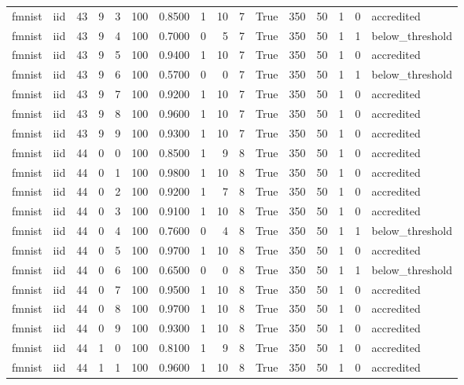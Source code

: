 \begin{tabular}{llrrrrrrrrrrrrrl}
fmnist & iid & 43 & 9 & 3 & 100 & 0.8500 & 1 & 10 & 7 & True & 350 & 50 & 1 & 0 & accredited \\
fmnist & iid & 43 & 9 & 4 & 100 & 0.7000 & 0 & 5 & 7 & True & 350 & 50 & 1 & 1 & below\_threshold \\
fmnist & iid & 43 & 9 & 5 & 100 & 0.9400 & 1 & 10 & 7 & True & 350 & 50 & 1 & 0 & accredited \\
fmnist & iid & 43 & 9 & 6 & 100 & 0.5700 & 0 & 0 & 7 & True & 350 & 50 & 1 & 1 & below\_threshold \\
fmnist & iid & 43 & 9 & 7 & 100 & 0.9200 & 1 & 10 & 7 & True & 350 & 50 & 1 & 0 & accredited \\
fmnist & iid & 43 & 9 & 8 & 100 & 0.9600 & 1 & 10 & 7 & True & 350 & 50 & 1 & 0 & accredited \\
fmnist & iid & 43 & 9 & 9 & 100 & 0.9300 & 1 & 10 & 7 & True & 350 & 50 & 1 & 0 & accredited \\
fmnist & iid & 44 & 0 & 0 & 100 & 0.8500 & 1 & 9 & 8 & True & 350 & 50 & 1 & 0 & accredited \\
fmnist & iid & 44 & 0 & 1 & 100 & 0.9800 & 1 & 10 & 8 & True & 350 & 50 & 1 & 0 & accredited \\
fmnist & iid & 44 & 0 & 2 & 100 & 0.9200 & 1 & 7 & 8 & True & 350 & 50 & 1 & 0 & accredited \\
fmnist & iid & 44 & 0 & 3 & 100 & 0.9100 & 1 & 10 & 8 & True & 350 & 50 & 1 & 0 & accredited \\
fmnist & iid & 44 & 0 & 4 & 100 & 0.7600 & 0 & 4 & 8 & True & 350 & 50 & 1 & 1 & below\_threshold \\
fmnist & iid & 44 & 0 & 5 & 100 & 0.9700 & 1 & 10 & 8 & True & 350 & 50 & 1 & 0 & accredited \\
fmnist & iid & 44 & 0 & 6 & 100 & 0.6500 & 0 & 0 & 8 & True & 350 & 50 & 1 & 1 & below\_threshold \\
fmnist & iid & 44 & 0 & 7 & 100 & 0.9500 & 1 & 10 & 8 & True & 350 & 50 & 1 & 0 & accredited \\
fmnist & iid & 44 & 0 & 8 & 100 & 0.9700 & 1 & 10 & 8 & True & 350 & 50 & 1 & 0 & accredited \\
fmnist & iid & 44 & 0 & 9 & 100 & 0.9300 & 1 & 10 & 8 & True & 350 & 50 & 1 & 0 & accredited \\
fmnist & iid & 44 & 1 & 0 & 100 & 0.8100 & 1 & 9 & 8 & True & 350 & 50 & 1 & 0 & accredited \\
fmnist & iid & 44 & 1 & 1 & 100 & 0.9600 & 1 & 10 & 8 & True & 350 & 50 & 1 & 0 & accredited \\

\end{tabular}
